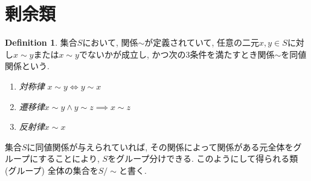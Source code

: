 \documentclass{article}
\theoremstyle{plain}
\theoremstyle{definition}
\newtheorem{definition}{Definition}
\theoremstyle{plain}
\numberwithin{equation}{section}
\numberwithin{theorem}{section}
\numberwithin{definition}{section}
\numberwithin{note}{section}
\begin{document}
\section{剰余類}
\begin{definition}
     集合$S$において, 関係$\sim$が定義されていて, 任意の二元$x,y\in S$に対し$x\sim y$または$x\sim y$でないかが成立し, かつ次の3条件を満たすとき関係$\sim$を同値関係という.
     \begin{enumerate}
          \item \emph{対称律} $x\sim y\iff y\sim x$
          \item \emph{遷移律}$x\sim y \land y\sim z \implies x\sim z$
          \item \emph{反射律}$x\sim x$
     \end{enumerate}
\end{definition}
集合$S$に同値関係が与えられていれば, その関係によって関係がある元全体をグループにすることにより, $S$をグループ分けできる. このようにして得られる類 (グループ) 全体の集合を$S/\sim$と書く.
\end{document}
